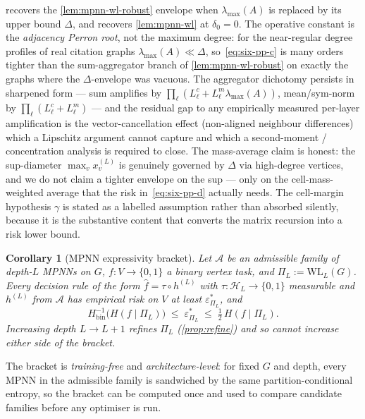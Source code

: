 \documentclass[10pt]{article}
\newtheorem{corollary}[theorem]{Corollary}
\theoremstyle{definition}
\theoremstyle{remark}
\newcommand{\Hinv}{H_{\mathrm{bin}}^{-1}}
\newcommand{\eps}{\varepsilon}
\begin{document}
 recovers the
\cref{lem:mpnn-wl-robust} envelope when $\lambda_{\max}(A)$ is
replaced by its upper bound $\Delta$, and recovers
\cref{lem:mpnn-wl} at $\delta_{0} = 0$. The operative constant
is the \emph{adjacency Perron root}, not the maximum degree:
for the near-regular degree profiles of real citation graphs
$\lambda_{\max}(A) \ll \Delta$, so~\eqref{eq:six-pp-c} is many
orders tighter than the sum-aggregator branch of
\cref{lem:mpnn-wl-robust} on exactly the graphs where the
$\Delta$-envelope was vacuous. The aggregator dichotomy persists
in sharpened form --- sum amplifies by
$\prod_{\ell}(L^{c}_{\ell} + L^{m}_{\ell} \lambda_{\max}(A))$,
mean/sym-norm by $\prod_{\ell}(L^{c}_{\ell} + L^{m}_{\ell})$ ---
and the residual gap to any empirically measured per-layer
amplification is the vector-cancellation effect (non-aligned
neighbour differences) which a Lipschitz argument cannot
capture and which a second-moment / concentration analysis is
required to close. The mass-average claim is honest: the
sup-diameter $\max_{v} x^{(L)}_{v}$ is genuinely governed by
$\Delta$ via high-degree vertices, and we do not claim a
tighter envelope on the sup --- only on the cell-mass-weighted
average that the risk in~\eqref{eq:six-pp-d} actually needs.
The cell-margin hypothesis $\gamma$ is stated as a labelled
assumption rather than absorbed silently, because it is the
substantive content that converts the matrix recursion into a
risk lower bound.

\begin{corollary}[MPNN expressivity bracket]\label{cor:mpnn-bracket}
Let $\mathcal{A}$ be an admissible family of depth-$L$ MPNNs on
$G$, $f : V \to \{0, 1\}$ a binary vertex task, and
$\Pi_{L} := \mathrm{WL}_{L}(G)$. Every decision rule of the form
$\widehat{f} = \tau \circ h^{(L)}$ with
$\tau : \mathcal{H}_{L} \to \{0, 1\}$ measurable and
$h^{(L)}$ from $\mathcal{A}$ has empirical risk on $V$ at least
$\eps^{\!*}_{\Pi_{L}}$, and
\[
  \Hinv\!\bigl(H(f \mid \Pi_{L})\bigr) \;\le\; \eps^{\!*}_{\Pi_{L}}
  \;\le\; \tfrac{1}{2}\, H(f \mid \Pi_{L}).
\]
Increasing depth $L \to L+1$ refines $\Pi_{L}$
(\cref{prop:refine}) and so cannot increase either side of the
bracket.
\end{corollary}

The bracket is \emph{training-free} and \emph{architecture-level}:
for fixed $G$ and depth, every MPNN in the admissible family is
sandwiched by the same partition-conditional entropy, so the
bracket can be computed once and used to compare candidate
families before any optimiser is run.
\end{document}
